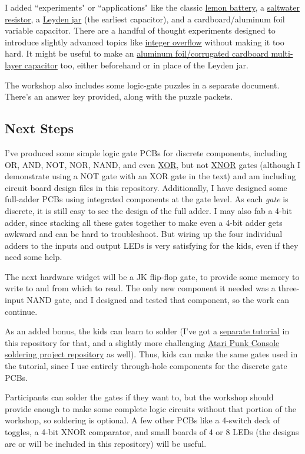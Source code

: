 I added ``experiments" or ``applications" like the classic {\color{webblue}\href{https://en.wikipedia.org/wiki/Lemon_battery}{lemon battery}}, a {\color{webblue}\href{https://en.wikipedia.org/wiki/Liquid_rheostat}{saltwater resistor}}, a {\color{webblue}\href{https://en.wikipedia.org/wiki/Leyden_jar}{Leyden jar}} (the earliest capacitor), and a cardboard/aluminum foil variable capacitor. There are a handful of thought experiments designed to introduce slightly advanced topics like {\color{webblue}\href{https://en.wikipedia.org/wiki/Integer_overflow}{integer overflow}} without making it too hard. It might be useful to make an {\color{webblue}\href{http://bizarrelabs.com/crystal.htm}{aluminum foil/corrugated cardboard multi-layer capacitor}} too, either beforehand or in place of the Leyden jar.


The workshop also includes some logic-gate puzzles in a separate document. There's an answer key provided, along with the puzzle packets.

\subsection*{Next Steps}

I've produced some simple logic gate PCBs for discrete components, including OR, AND, NOT, NOR, NAND, and even {\color{webblue}\href{https://en.wikipedia.org/wiki/XOR_gate}{XOR}}, but not {\color{webblue}\href{https://en.wikipedia.org/wiki/XNOR_gate}{XNOR}} gates (although I demonstrate using a NOT gate with an XOR gate in the text) and am including circuit board design files in this repository. Additionally, I have designed some full-adder PCBs using integrated components at the gate level. As each \emph{gate} is discrete, it is still easy to see the design of the full adder. I may also fab a 4-bit adder, since stacking all these gates together to make even a 4-bit adder gets awkward and can be hard to troubleshoot. But wiring up the four individual adders to the inputs and output LEDs is very satisfying for the kids, even if they need some help.

The next hardware widget will be a JK flip-flop gate, to provide some memory to write to and from which to read.
The only new component it needed was a three-input NAND gate, and I designed and tested that component, so the work can continue.

As an added bonus, the kids can learn to solder (I've got a {\color{webblue}\href{https://github.com/jessehamner/TechMillForKids/tree/master/soldering}{separate tutorial}} in this repository for that, and a slightly more challenging {\color{webblue}\href{https://github.com/jessehamner/AtariPunkConsole}{Atari Punk Console soldering project repository}} as well). Thus, kids can make the same gates used in the tutorial, since I use entirely through-hole components for the discrete gate PCBs. 

Participants can solder the gates if they want to, but the workshop should provide enough to make some complete logic circuits without that portion of the workshop, so soldering is optional. A few other PCBs like a 4-switch deck of toggles, a 4-bit XNOR comparator, and small boards of 4 or 8 LEDs (the designs are or will be included in this repository) will be  useful.
